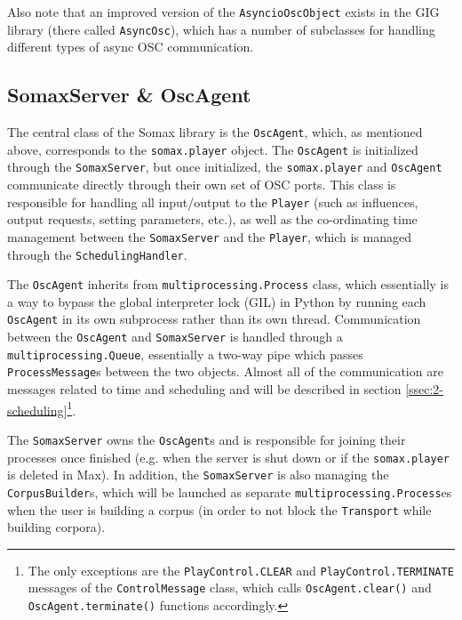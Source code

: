 Also note that an improved version of the \texttt{AsyncioOscObject} exists in the GIG library (there called \texttt{AsyncOsc}), which has a number of subclasses for handling different types of async OSC communication.


\subsection{SomaxServer \& OscAgent}\label{ssec:2-server-agent}
The central class of the Somax library is the \texttt{OscAgent}, which, as mentioned above, corresponds to the \texttt{somax.player} object. The \texttt{OscAgent} is initialized through the \texttt{SomaxServer}, but once initialized, the \texttt{somax.player} and \texttt{OscAgent} communicate directly through their own set of OSC ports. This class is responsible for handling all input/output to the \texttt{Player} (such as influences, output requests, setting parameters, etc.), as well as the co-ordinating time management between the \texttt{SomaxServer} and the \texttt{Player}, which is managed through the \texttt{SchedulingHandler}.

The \texttt{OscAgent} inherits from \texttt{multiprocessing.Process} class, which essentially is a way to bypass the global interpreter lock (GIL) in Python by running each \texttt{OscAgent} in its own subprocess rather than its own thread. Communication between the \texttt{OscAgent} and \texttt{SomaxServer} is handled through a \texttt{multiprocessing.Queue}, essentially a two-way pipe which passes \texttt{ProcessMessage}s between the two objects. Almost all of the communication are messages related to time and scheduling and will be described in section \ref{ssec:2-scheduling}\footnote{The only exceptions are the \texttt{PlayControl.CLEAR} and \texttt{PlayControl.TERMINATE} messages of the \texttt{ControlMessage} class, which calls \texttt{OscAgent.clear()} and \texttt{OscAgent.terminate()} functions accordingly.}.

The \texttt{SomaxServer} owns the \texttt{OscAgent}s and is responsible for joining their processes once finished (e.g. when the server is shut down or if the \texttt{somax.player} is deleted in Max). In addition, the \texttt{SomaxServer} is also managing the \texttt{CorpusBuilder}s, which will be launched as separate \texttt{multiprocessing.Process}es when the user is building a corpus (in order to not block the \texttt{Transport} while building corpora). 

